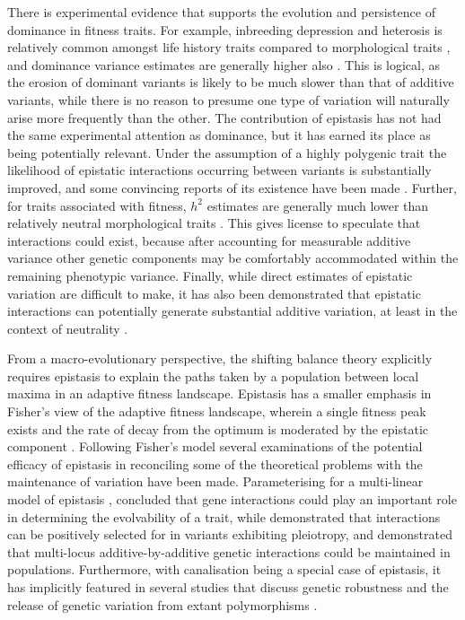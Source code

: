There is experimental evidence that supports the evolution and persistence of dominance in fitness traits. For example, inbreeding depression and heterosis is relatively common amongst life history traits compared to morphological traits \citep{DeRose1999}, and dominance variance estimates are generally higher also \citep{Crnokrak1995}. This is logical, as the erosion of dominant variants is likely to be much slower than that of additive variants, while there is no reason to presume one type of variation will naturally arise more frequently than the other. The contribution of epistasis has not had the same experimental attention as dominance, but it has earned its place as being potentially relevant. Under the assumption of a highly polygenic trait the likelihood of epistatic interactions occurring between variants is substantially improved, and some convincing reports of its existence have been made \citep{Carlborg2006}. Further, for traits associated with fitness, $h^2$ estimates are generally much lower than relatively neutral morphological traits \citep{Mousseau1987}. This gives license to speculate that interactions could exist, because after accounting for measurable additive variance other genetic components may be comfortably accommodated within the remaining phenotypic variance. Finally, while direct estimates of epistatic variation are difficult to make, it has also been demonstrated that epistatic interactions can potentially generate substantial additive variation, at least in the context of neutrality \citep{Hill2008a,Greene2009}.

From a macro-evolutionary perspective, the shifting balance theory \citep{Wright1931} explicitly requires epistasis to explain the paths taken by a population between local maxima in an adaptive fitness landscape. Epistasis has a smaller emphasis in Fisher's view of the adaptive fitness landscape, wherein a single fitness peak exists and the rate of decay from the optimum is moderated by the epistatic component \citep{Fisher1930}. Following Fisher's model several examinations of the potential efficacy of epistasis in reconciling some of the theoretical problems with the maintenance of variation have been made. Parameterising for a multi-linear model of epistasis \citep{Hansen2001}, \cite{Carter2005} concluded that gene interactions could play an important role in determining the evolvability of a trait, while \cite{Liberman2005} demonstrated that interactions can be positively selected for in variants exhibiting pleiotropy, and \cite{Hansen2004} demonstrated that multi-locus additive-by-additive genetic interactions could be maintained in populations. Furthermore, with canalisation being a special case of epistasis, it has implicitly featured in several studies that discuss genetic robustness and the release of genetic variation from extant polymorphisms \citep{Gros2009,Bergman2003}.


